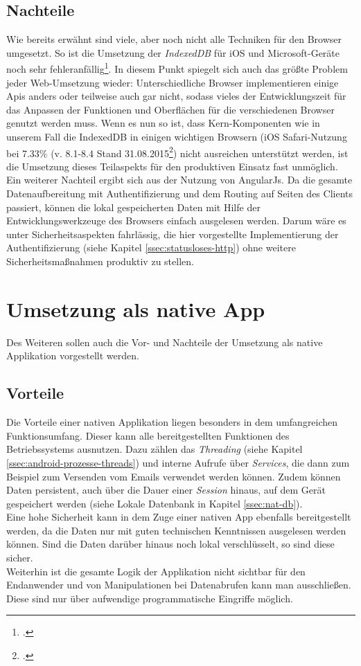 \subsection{Nachteile}
\label{sec:nachteile-SPA}
Wie bereits erwähnt sind viele, aber noch nicht alle Techniken für den Browser umgesetzt. So ist die Umsetzung der \textit{IndexedDB} für iOS und Microsoft-Geräte noch sehr fehleranfällig\footcite{online:caniuse:indexedDB}. In diesem Punkt spiegelt sich auch das größte Problem jeder Web-Umsetzung wieder: Unterschiedliche Browser implementieren einige Apis anders oder teilweise auch gar nicht, sodass vieles der Entwicklungszeit für das Anpassen der Funktionen und Oberflächen für die verschiedenen Browser genutzt werden muss. Wenn es nun so ist, dass Kern-Komponenten wie in unserem Fall die IndexedDB in einigen wichtigen Browsern (iOS Safari-Nutzung bei 7.33\% (v. 8.1-8.4 Stand 31.08.2015\footcite{online:caniuse:indexedDB}) nicht ausreichen unterstützt werden, ist die Umsetzung dieses Teilaspekts für den produktiven Einsatz fast unmöglich. \\
Ein weiterer Nachteil ergibt sich aus der Nutzung von AngularJs. Da die gesamte Datenaufbereitung mit Authentifizierung und dem Routing auf Seiten des Clients passiert, können die lokal gespeicherten Daten mit Hilfe der Entwicklungswerkzeuge des Browsers einfach ausgelesen werden. Darum wäre es unter Sicherheitsaspekten fahrlässig, die hier vorgestellte Implementierung der Authentifizierung (siehe Kapitel \ref{ssec:statusloses-http}) ohne weitere Sicherheitsmaßnahmen produktiv zu stellen.

\section{Umsetzung als native App}
\label{sec:gegenueberstellung-native-app}
Des Weiteren sollen auch die Vor- und Nachteile der Umsetzung als native Applikation vorgestellt werden.

\subsection{Vorteile}
\label{sec:vorteile-native-app}
Die Vorteile einer nativen Applikation liegen besonders in dem umfangreichen Funktionsumfang. Dieser kann alle bereitgestellten Funktionen des Betriebssystems ausnutzen. Dazu zählen das \textit{Threading} (siehe Kapitel \ref{ssec:android-prozesse-threads}) und interne Aufrufe über \textit{Services}, die dann zum Beispiel zum Versenden vom Emails verwendet werden können. Zudem können Daten persistent, auch über die Dauer einer \textit{Session} hinaus, auf dem Gerät gespeichert werden (siehe Lokale Datenbank in Kapitel \ref{ssec:nat-db}).\\
Eine hohe Sicherheit kann in dem Zuge einer nativen App ebenfalls bereitgestellt werden, da die Daten nur mit guten technischen Kenntnissen ausgelesen werden können. Sind die Daten darüber hinaus noch lokal verschlüsselt, so sind diese sicher.\\
Weiterhin ist die gesamte Logik der Applikation nicht sichtbar für den Endanwender und von Manipulationen bei Datenabrufen kann man ausschließen. Diese sind nur über aufwendige programmatische Eingriffe möglich.

